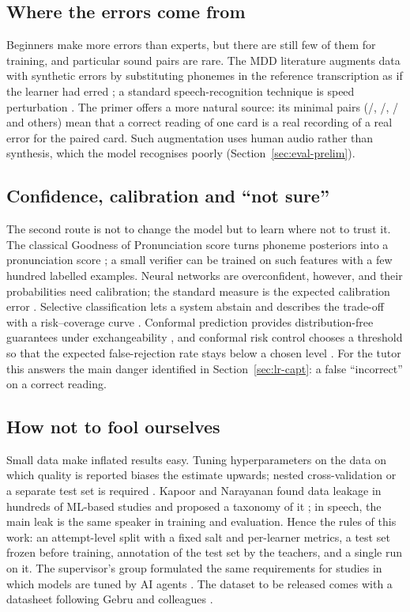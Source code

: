 \subsection{Where the errors come from}

Beginners make more errors than experts, but there are still few of them for training, and particular
sound pairs are rare. The MDD literature augments data with synthetic errors by substituting phonemes in
the reference transcription as if the learner had erred \cite{SRC-119}; a standard speech-recognition
technique is speed perturbation \cite{SRC-120}. The primer offers a more natural source: its minimal
pairs (/, /, / and others) mean that a correct reading of one card is
a real recording of a real error for the paired card. Such augmentation uses human audio rather than
synthesis, which the model recognises poorly (Section~\ref{sec:eval-prelim}).

\subsection{Confidence, calibration and ``not sure''}

The second route is not to change the model but to learn where not to trust it. The classical Goodness
of Pronunciation score turns phoneme posteriors into a pronunciation score \cite{SRC-115}; a small
verifier can be trained on such features with a few hundred labelled examples. Neural networks are
overconfident, however, and their probabilities need calibration; the standard measure is the expected
calibration error \cite{SRC-112}. Selective classification lets a system abstain and describes the
trade-off with a risk--coverage curve \cite{SRC-117}. Conformal prediction provides distribution-free
guarantees under exchangeability \cite{SRC-113}, and conformal risk control chooses a threshold so that
the expected false-rejection rate stays below a chosen level \cite{SRC-114}. For the tutor this answers
the main danger identified in Section~\ref{sec:lr-capt}: a false ``incorrect'' on a correct reading.

\subsection{How not to fool ourselves}

Small data make inflated results easy. Tuning hyperparameters on the data on which quality is reported
biases the estimate upwards; nested cross-validation or a separate test set is required \cite{SRC-121}.
Kapoor and Narayanan found data leakage in hundreds of ML-based studies and proposed a taxonomy of it
\cite{SRC-122}; in speech, the main leak is the same speaker in training and evaluation. Hence the rules
of this work: an attempt-level split with a fixed salt and per-learner metrics, a test set frozen before training, annotation of the test
set by the teachers, and a single run on it. The supervisor's group formulated the same requirements for studies in
which models are tuned by AI agents \cite{SRC-067}. The dataset to be released comes with a datasheet
following Gebru and colleagues \cite{SRC-123}.

